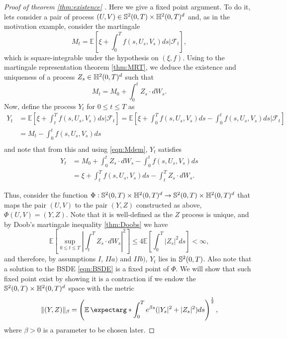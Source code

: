\begin{proof}[Proof of theorem \ref{thm:existence} ]
Here we give a fixed point argument. To do it, lets consider a pair of process $(U,V)\in\mathbb{S}^2(0,T)\times\mathbb{H}^2(0,T)^d$ and, as in the motivation example, consider the martingale
\begin{equation}
	M_t=\mathbb{E}\left[\xi +\int_{0}^{T}f(s,U_s,V_s)ds \Bigg| \mathcal{F}_t \right],
\end{equation}
which is square-integrable under the hypothesis on $(\xi,f)$. Using to the martingale representation theorem \ref{thm:MRT}, we deduce the existence and uniqueness of a process $Z_s\in \mathbb{H}^2(0,T)^d$ such that
\begin{equation}
	\label{eqn:Mdem}
	M_t=M_0+\int_{0}^{t}Z_s \cdot dW_s.
\end{equation}
Now, define the process $Y_t$ for $0\leq t\leq T$ as
\begin{equation}
	\begin{split}
	Y_t&=\mathbb{E}\left[\xi +\int_{t}^{T}f(s,U_s,V_s)ds \Bigg| \mathcal{F}_t \right]=\mathbb{E}\left[\xi +\int_{0}^{T}f(s,U_s,V_s)ds-\int_{0}^{t}f(s,U_s,V_s)ds  \Bigg| \mathcal{F}_t \right]\\
	&=M_t-\int_{0}^{t}f(s,U_s,V_s)ds\\
	\end{split}
\end{equation}
and note that from this and using \eqref{eqn:Mdem}, $Y_t$ satisfies 
\begin{equation}
	\label{eqn:SdeY}
	\begin{split}
		Y_t&=M_0+\int_{0}^{t}Z_s \cdot dW_s-\int_{0}^{t}f(s,U_s,V_s)ds\\
		&=\xi+\int_{t}^{T}f(s,U_s,V_s)ds-\int_{t}^{T} Z_s\cdot dW_s.
	\end{split}
\end{equation}


Thus, consider the function $\Phi:\mathbb{S}^2(0,T)\times\mathbb{H}^2(0,T)^d \to \mathbb{S}^2(0,T)\times\mathbb{H}^2(0,T)^d$ that maps the pair $(U,V)$ to the pair $(Y,Z)$ constructed as above, $\Phi(U,V)=(Y,Z)$. Note that it is well-defined as the $Z$ process is unique, and by Doob's martingale inequality \ref{thm:Doobs} we have
\begin{equation}
	\mathbb{E}\left[\sup_{0\leq t\leq T}\left|\int_{t}^{T}Z_s\cdot dW_s\right|^2\right]\leq 4\mathbb{E}\left[\int_{0}^{T}|Z_s|^2ds\right]<\infty,
\end{equation}
and therefore, by assumptions $I$, $II a)$ and $II b)$, $Y_t$ lies in $\mathbb{S}^2(0,T)$. Also note that a solution to the BSDE \eqref{eqn:BSDE} is a fixed point of $\Phi$. We will show that such fixed point exist by showing it is a contraction if we endow the $\mathbb{S}^2(0,T)\times\mathbb{H}^2(0,T)^d$ space with the metric 
\begin{equation}
	\lVert(Y,Z)\rVert_\beta=\left(\expect*{\int_{0}^{T}e^{\beta s}(  |Y_s|^2+|Z_s|^2)ds}\right)^{\frac{1}{2}},
\end{equation}
where $\beta>0$ is a parameter to be chosen later.


\end{proof}
